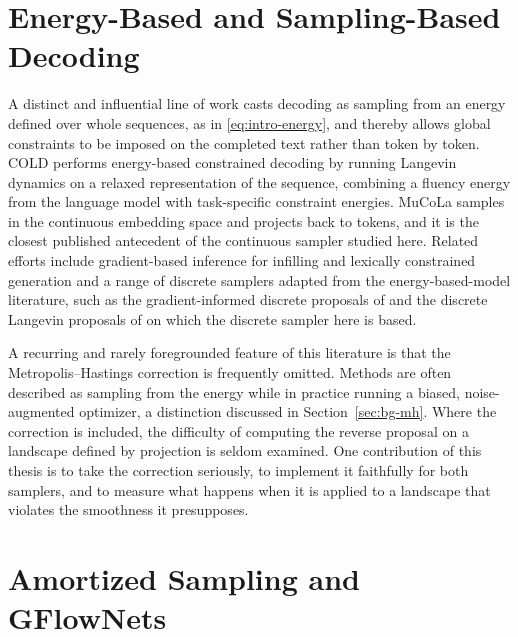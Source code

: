 \section{Energy-Based and Sampling-Based Decoding}
\label{sec:rel-energy}

A distinct and influential line of work casts decoding as sampling from an energy defined over whole sequences, as in \eqref{eq:intro-energy}, and thereby allows global constraints to be imposed on the completed text rather than token by token. COLD \citep{qin2022cold} performs energy-based constrained decoding by running Langevin dynamics on a relaxed representation of the sequence, combining a fluency energy from the language model with task-specific constraint energies. MuCoLa \citep{kumar2022gradient} samples in the continuous embedding space and projects back to tokens, and it is the closest published antecedent of the continuous sampler studied here. Related efforts include gradient-based inference for infilling and lexically constrained generation \citep{sha2020gradient} and a range of discrete samplers adapted from the energy-based-model literature, such as the gradient-informed discrete proposals of \citet{grathwohl2021oops} and the discrete Langevin proposals of \citet{zhang2022langevin} on which the discrete sampler here is based.

A recurring and rarely foregrounded feature of this literature is that the Metropolis--Hastings correction is frequently omitted. Methods are often described as sampling from the energy while in practice running a biased, noise-augmented optimizer, a distinction discussed in Section~\ref{sec:bg-mh}. Where the correction is included, the difficulty of computing the reverse proposal on a landscape defined by projection is seldom examined. One contribution of this thesis is to take the correction seriously, to implement it faithfully for both samplers, and to measure what happens when it is applied to a landscape that violates the smoothness it presupposes.

\section{Amortized Sampling and GFlowNets}
\label{sec:rel-gflownet}


